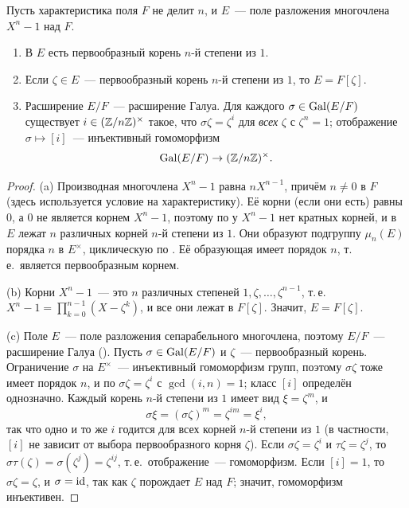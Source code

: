\begin{proposition}[5.8]
Пусть характеристика поля $F$ не делит $n$, и $E$~--- поле разложения многочлена $X^n-1$ над $F$.
\begin{enumerate}[label=\textup{(\alph*)}]
\item В $E$ есть первообразный корень $n$-й степени из $1$.
\item Если $\zeta\in E$~--- первообразный корень $n$-й степени из $1$, то $E=F[\zeta]$.
\item Расширение $E/F$~--- расширение Галуа. Для каждого $\sigma\in\operatorname{Gal}(E/F)$ существует $i\in(\mathbb Z/n\mathbb Z)^\times$ такое, что
$\sigma\zeta=\zeta^i$ для \emph{всех} $\zeta$ с $\zeta^n=1$; отображение $\sigma\mapsto[i]$~--- инъективный гомоморфизм
\[
\operatorname{Gal}(E/F)\to(\mathbb Z/n\mathbb Z)^\times .
\]
\end{enumerate}
\end{proposition}

\begin{proof}
(a) Производная многочлена $X^n-1$ равна $nX^{n-1}$, причём $n\ne0$ в $F$ (здесь используется условие на
характеристику). Её корни (если они есть) равны $0$, а $0$ не является корнем $X^n-1$, поэтому по  у $X^n-1$ нет
кратных корней, и
в $E$ лежат $n$ различных корней $n$-й степени из $1$. Они образуют подгруппу $\mu_n(E)$ порядка $n$ в $E^\times$,
циклическую по . Её образующая имеет порядок $n$, т.\,е.\ является первообразным корнем.

(b) Корни $X^n-1$~--- это $n$ различных степеней $1,\zeta,\dots,\zeta^{n-1}$, т.\,е.\
$X^n-1=\prod_{k=0}^{n-1}(X-\zeta^k)$, и все они лежат в $F[\zeta]$. Значит, $E=F[\zeta]$.

(c) Поле $E$~--- поле разложения сепарабельного многочлена, поэтому $E/F$~--- расширение Галуа (). Пусть
$\sigma\in\operatorname{Gal}(E/F)$ и $\zeta$~--- первообразный корень. Ограничение $\sigma$ на $E^\times$~--- инъективный гомоморфизм
групп, поэтому $\sigma\zeta$ тоже имеет порядок $n$, и по \rf{5.7b} $\sigma\zeta=\zeta^i$ с $\gcd(i,n)=1$; класс $[i]$ определён
однозначно. Каждый корень $n$-й степени из $1$ имеет вид $\xi=\zeta^m$, и
\[
\sigma\xi=(\sigma\zeta)^m=\zeta^{im}=\xi^i,
\]
так что одно и то же $i$ годится для всех корней $n$-й степени из $1$ (в частности, $[i]$ не зависит от выбора
первообразного корня $\zeta$). Если $\sigma\zeta=\zeta^i$ и $\tau\zeta=\zeta^j$, то
$\sigma\tau(\zeta)=\sigma(\zeta^j)=\zeta^{ij}$, т.\,е.\ отображение~--- гомоморфизм. Если $[i]=1$, то $\sigma\zeta=\zeta$, и
$\sigma=\operatorname{id}$, так как $\zeta$ порождает $E$ над $F$; значит, гомоморфизм инъективен.
\end{proof}

